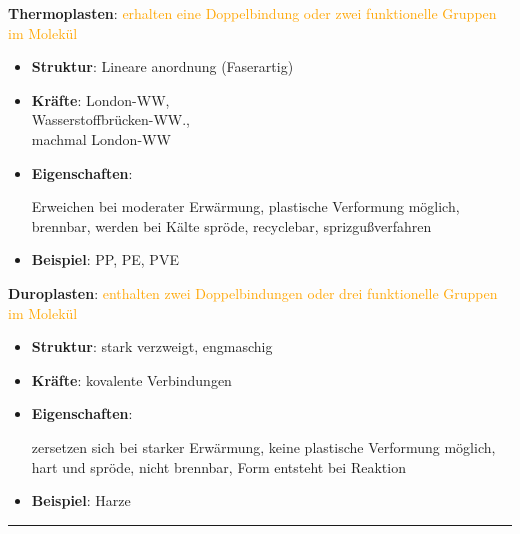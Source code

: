 \begin{minipage}[t]{0.4\textwidth}
    \textbf{Thermoplasten}: \textcolor{orange}{erhalten eine Doppelbindung oder zwei funktionelle Gruppen im Molekül}
    \begin{itemize}
        \item \textbf{Struktur}: Lineare anordnung (Faserartig)
        \item \textbf{Kräfte}: London-WW, \\ Wasserstoffbrücken-WW., \\ machmal London-WW
        \item \textbf{Eigenschaften}:
        \par Erweichen bei moderater Erwärmung, plastische Verformung möglich, brennbar, werden bei Kälte spröde, recyclebar, sprizgußverfahren
        \item \textbf{Beispiel}: PP, PE, PVE
    \end{itemize}

\end{minipage}
\hspace{0.5cm}
\vrule width 0.4pt
\hspace{0.5cm}
\begin{minipage}[t]{0.45\textwidth}

    \textbf{Duroplasten}: \textcolor{orange}{enthalten zwei Doppelbindungen oder drei funktionelle Gruppen im Molekül}
    \begin{itemize}
        \item \textbf{Struktur}: stark verzweigt, engmaschig
        \item \textbf{Kräfte}: kovalente Verbindungen
        \item \textbf{Eigenschaften}:
        \par zersetzen sich bei starker Erwärmung, keine plastische Verformung möglich, hart und spröde, nicht brennbar, Form entsteht bei Reaktion
        \item \textbf{Beispiel}: Harze
    \end{itemize}

\end{minipage}

\hrule
\vspace{0.3cm}


